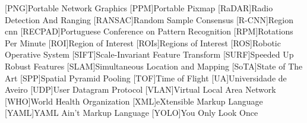 \begin{multicols}{2}
\begin{acronym}[AAAAAA]
	[PNG]{Portable Network Graphics}
	[PPM]{Portable Pixmap}
	[RaDAR]{Radio Detection And Ranging}
	[RANSAC]{Random Sample Consensus}
	[R-CNN]{Region \acl{cnn}}
	[RECPAD]{Portuguese Conference on Pattern Recognition}
	[RPM]{Rotations Per Minute}
	[ROI]{Region of Interest}
	[ROIs]{Regions of Interest}
	[ROS]{Robotic Operative System}
	[SIFT]{Scale-Invariant Feature Transform}
	[SURF]{Speeded Up Robust Features}
	[SLAM]{Simultaneous Location and Mapping} 
	[SoTA]{State of The Art}
	[SPP]{Spatial Pyramid Pooling}
	[TOF]{Time of Flight} 
	[UA]{Universidade de Aveiro}
	[UDP]{User Datagram Protocol}
	[VLAN]{Virtual Local Area Network}
	[WHO]{World Health Organization}
	[XML]{eXtensible Markup Language}
	[YAML]{YAML Ain't Markup Language}
	[YOLO]{You Only Look Once}
\end{acronym}
\end{multicols}

